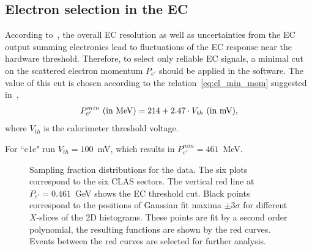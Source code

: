 \subsection{Electron selection in the EC}
\label{Sect:ec_cuts}

According to~\cite{Egian:007}, the overall EC resolution as well as uncertainties from the EC output summing electronics lead to fluctuations of the EC response near the hardware threshold. Therefore, to select only reliable EC signals, a minimal cut on the scattered electron momentum $P_{e'}$ should be applied in the software. The value of this cut is chosen according to the relation~\eqref{eq:el_min_mom} suggested in~\cite{Egian:007},\vspace{-0.85em}
\begin{equation}
P_{e'}^{min}~(\textrm{in~MeV}) = 214 + 2.47\cdot V_{th}~(\textrm{in~mV})\\[-14pt],
\label{eq:el_min_mom}
\end{equation}
where $V_{th}$ is the calorimeter threshold voltage.

For ``e1e" run $V_{th} = 100$~mV, which results in $P_{e'}^{min} = 461$~MeV.

\begin{figure}[htp]
\begin{center}
\caption{\small Sampling fraction distributions for the data. The six plots correspond to the six CLAS sectors. The vertical red line at $P_{e'} = 0.461$~GeV shows the EC threshold cut. Black points correspond to the positions of Gaussian fit maxima $\pm 3\sigma$ for different $X$-slices of the 2D histograms. These points are fit by a second order polynomial, the resulting functions are shown by the red curves. Events between the red curves are selected for further analysis.} \label{fig:ec_cut_data}
\end{center}
\end{figure}

